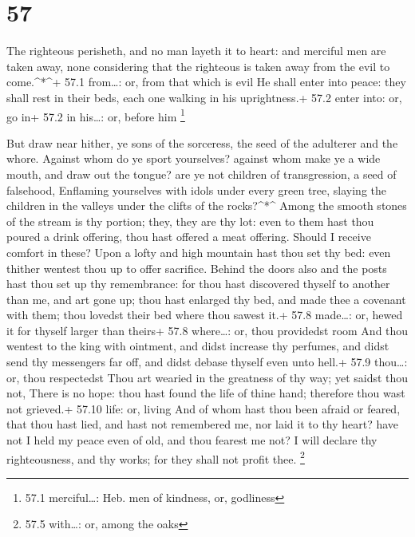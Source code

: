 \hypertarget{section-56}{%
\section{57}\label{section-56}}

 The righteous perisheth, and no man layeth it to heart: and
merciful men are taken away, none considering that the righteous is
taken away from the evil to come.\^{}*\^{}+ 57.1 from\ldots: or, from
that which is evil  He shall enter into peace: they shall
rest in their beds, each one walking in his uprightness.+ 57.2 enter
into: or, go in+ 57.2 in his\ldots: or, before him \footnote{57.1
  merciful\ldots: Heb. men of kindness, or, godliness}

 But draw near hither, ye sons of the sorceress, the seed of
the adulterer and the whore.  Against whom do ye sport
yourselves? against whom make ye a wide mouth, and draw out the tongue?
are ye not children of transgression, a seed of falsehood, 
Enflaming yourselves with idols under every green tree, slaying the
children in the valleys under the clifts of the rocks?\^{}*\^{}
 Among the smooth stones of the stream is thy portion; they,
they are thy lot: even to them hast thou poured a drink offering, thou
hast offered a meat offering. Should I receive comfort in these?
 Upon a lofty and high mountain hast thou set thy bed: even
thither wentest thou up to offer sacrifice.  Behind the
doors also and the posts hast thou set up thy remembrance: for thou hast
discovered thyself to another than me, and art gone up; thou hast
enlarged thy bed, and made thee a covenant with them; thou lovedst their
bed where thou sawest it.+ 57.8 made\ldots: or, hewed it for thyself
larger than theirs+ 57.8 where\ldots: or, thou providedst room
 And thou wentest to the king with ointment, and didst
increase thy perfumes, and didst send thy messengers far off, and didst
debase thyself even unto hell.+ 57.9 thou\ldots: or, thou respectedst
 Thou art wearied in the greatness of thy way; yet saidst
thou not, There is no hope: thou hast found the life of thine hand;
therefore thou wast not grieved.+ 57.10 life: or, living 
And of whom hast thou been afraid or feared, that thou hast lied, and
hast not remembered me, nor laid it to thy heart? have not I held my
peace even of old, and thou fearest me not?  I will declare
thy righteousness, and thy works; for they shall not profit thee.
\footnote{57.5 with\ldots: or, among the oaks}

